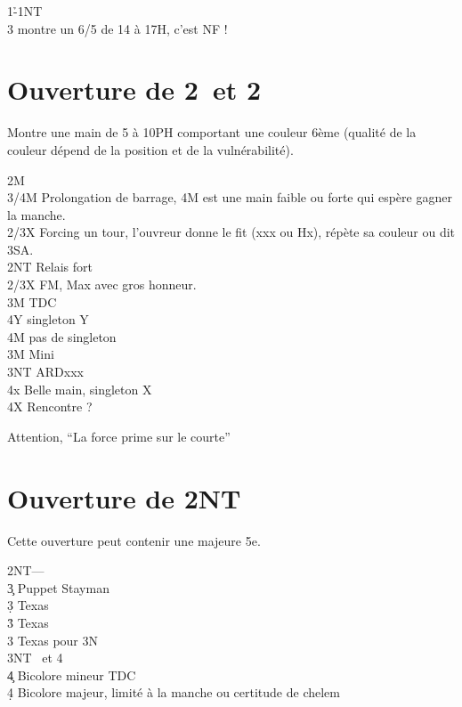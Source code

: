 \documentclass[a4paper]{article}
\begin{document}
\begin{bidtable}
1\h-1NT\\
3\s \> montre un 6/5 de 14 à 17H, c’est NF !
\end{bidtable}

\section{Ouverture de 2\pdfh\ et 2\pdfs}

Montre une main de 5 à 10PH comportant une couleur 6ème (qualité de la couleur dépend de la position et de la vulnérabilité).

\begin{bidtable}
2M\+\\
3/4M \> Prolongation de barrage, 4M est une main faible ou forte qui espère gagner la manche.\\
2/3X \> Forcing un tour, l'ouvreur donne le fit (xxx ou Hx), répète sa couleur ou dit 3SA.\\
2NT \> Relais fort\+\\
2/3X \> FM, Max avec gros honneur.\+\\
3M \> TDC\+\\
4Y \> singleton Y\\
4M \> pas de singleton\-\-\\
3M \> Mini\\
3NT \> ARDxxx\\
4x \> Belle main, singleton X\-\\
4X \> Rencontre ?\-
\end{bidtable}

Attention, ``La force prime sur le courte''

\section{Ouverture de 2NT}

Cette ouverture peut contenir une majeure 5e.

\begin{bidtable}
2NT---\\
3\c \> Puppet Stayman\\
3\d \> Texas \h \\
3\h \> Texas \s \\
3\s \> Texas pour 3N\\
3NT \s\ et 4\h \\
4\c \> Bicolore mineur TDC\\
4\d \> Bicolore majeur, limité à la manche ou certitude de chelem
\end{bidtable}
\end{document}
